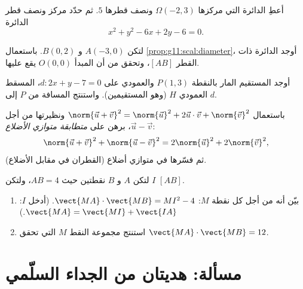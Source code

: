\begin{exercise}[$\star\star$]\label{exo:g11:scal:7}
أعطِ  الدائرة التي مركزها $\Omega(-2, 3)$ ونصف قطرها $5$.
ثم حدّد مركز ونصف قطر الدائرة
\[
x^2 + y^2 - 6x + 2y - 6 = 0 .
\]
\end{exercise}

\begin{exercise}[$\star\star$]\label{exo:g11:scal:8}
لتكن $A(-3, 0)$ و $B(0, 2)$. باستعمال \cref{prop:g11:scal:diameter}، أوجد
 الدائرة ذات القطر $[AB]$، وتحقق من أن المبدأ
$O(0,0)$ يقع عليها.
\end{exercise}

\begin{exercise}[$\star\star$]\label{exo:g11:scal:9}
أوجد  المستقيم المار بالنقطة $P(1, 3)$ والعمودي على
$d : 2x + y - 7 = 0$،  المسقط العمودي $H$ (وهو 
المستقيمين). واستنتج المسافة من $P$ إلى $d$.
\end{exercise}

\begin{exercise}[$\star\star$]\label{exo:g11:scal:10}
باستعمال $\norm{\vec u + \vec v}^2 = \norm{\vec u}^2 + 2\vec u\cdot\vec v +
\norm{\vec v}^2$ ونظيرتها من أجل $\vec u - \vec v$، برهن على
\emph{متطابقة متوازي الأضلاع}:
\[
\norm{\vec u + \vec v}^2 + \norm{\vec u - \vec v}^2
= 2\norm{\vec u}^2 + 2\norm{\vec v}^2 ,
\]
ثم فسّرها في متوازي أضلاع (القطران في مقابل الأضلاع).
\end{exercise}

\begin{exercise}[$\star\star\star$]\label{exo:g11:scal:11}
لتكن $A$ و $B$ نقطتين حيث $AB = 4$، ولتكن $I$ 
$[AB]$.
\begin{enumerate}
  \item بيّن أنه من أجل كل نقطة $M$:
        $\vect{MA}\cdot\vect{MB} = MI^2 - 4$.
        (أدخل $I$: $\vect{MA} = \vect{MI} + \vect{IA}$.)
  \item استنتج مجموعة النقط $M$ التي تحقق
        $\vect{MA}\cdot\vect{MB} = 12$.
\end{enumerate}
\end{exercise}

\section{مسألة: هديتان من الجداء السلّمي}

